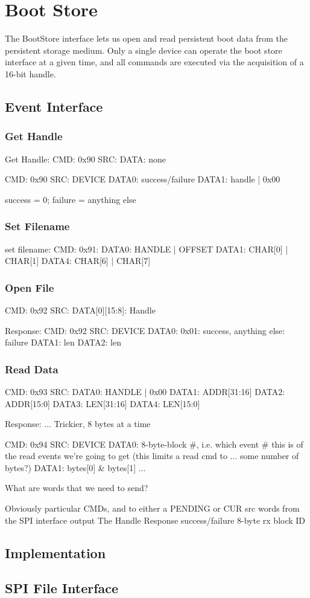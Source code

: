\section{Boot Store}

The BootStore interface lets us open and read persistent boot data
from the persistent storage medium. Only a single device can operate
the boot store interface at a given time, and all commands are
executed via the acquisition of a 16-bit handle.

\subsection{Event Interface}
\subsubsection{Get Handle}

Get Handle: 
CMD: 0x90
SRC: 
DATA: none

\response
CMD: 0x90
SRC: DEVICE
DATA0: success/failure
DATA1: handle | 0x00

success = 0; failure = anything else

\subsubsection{Set Filename}
set filename: 
CMD: 0x91:
DATA0: HANDLE | OFFSET
DATA1:  CHAR[0] | CHAR[1]
DATA4:  CHAR[6] | CHAR[7]


\subsubsection{Open File} 
CMD: 0x92
SRC: 
DATA[0][15:8]: Handle

Response: 
CMD: 0x92
SRC: DEVICE
DATA0: 0x01: success, anything else: failure
DATA1: len
DATA2: len

\subsubsection{Read Data}

CMD: 0x93
SRC: 
DATA0: HANDLE | 0x00
DATA1: ADDR[31:16]
DATA2: ADDR[15:0]
DATA3: LEN[31:16]
DATA4: LEN[15:0]

Response: ... Trickier, 8 bytes at a time

 
CMD: 0x94
SRC: DEVICE
DATA0: 8-byte-block #, i.e. which event # this is of the read events we're going to get (this limits a read cmd to ... some number of bytes?)
DATA1: bytes[0] & bytes[1]
...

What are words that we need to send? 

Obviously particular CMDs, and to either a PENDING or CUR src
words from the SPI interface output
The Handle
Response success/failure
8-byte rx block ID

\subsection{Implementation}

\subsection{SPI File Interface}
